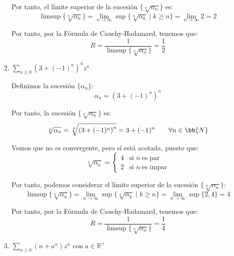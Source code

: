 \begin{ejercicio}
\begin{enumerate}
        Por tanto, el límite superior de la sucesión $\{\sqrt[n]{\alpha_n}\}$ es:
        \begin{equation*}
            \limsup\{\sqrt[n]{\alpha_n}\} = \lim_{n \to \infty} \sup\{\sqrt[k]{\alpha_k} \mid k \geq n\} = \lim_{n \to \infty} 2 = 2
        \end{equation*}

        Por tanto, por la Fórmula de Cauchy-Hadamard, tenemos que:
        \begin{equation*}
            R = \dfrac{1}{\limsup\{\sqrt[n]{\alpha_n}\}} = \dfrac{1}{2}
        \end{equation*}
        
        \item $\displaystyle \sum_{n \geq 0} \left(3+(-1)^n\right)^n z^n$
        
        Definimos la sucesión $\{\alpha_n\}$:
        \[
            \alpha_n = \left(3+(-1)^n\right)^n
        \]

        Por tanto, la sucesión $\{\sqrt[n]{\alpha_n}\}$ es:
        \[
            \sqrt[n]{\alpha_n} = \sqrt[n]{\left(3+(-1)^n\right)^n} = 3+(-1)^n\qquad \forall n\in \bb{N}
        \]

        Vemos que no es convergente, pero sí está acotada, puesto que:
        \begin{equation*}
            \sqrt[n]{\alpha_n} = \begin{cases}
                4 & \text{si } n\ \text{es par}\\
                2 & \text{si } n\ \text{es impar}
            \end{cases}
        \end{equation*}

        Por tanto, podemos considerar el límite superior de la sucesión $\{\sqrt[n]{\alpha_n}\}$:
        \begin{equation*}
            \limsup\{\sqrt[n]{\alpha_n}\} = \lim_{n \to \infty} \sup\{\sqrt[k]{\alpha_k} \mid k \geq n\} = \lim_{n \to \infty} \sup\{2,4\} = 4
        \end{equation*}

        Por tanto, por la Fórmula de Cauchy-Hadamard, tenemos que:
        \begin{equation*}
            R = \dfrac{1}{\limsup\{\sqrt[n]{\alpha_n}\}} = \dfrac{1}{4}
        \end{equation*}

        \item $\displaystyle \sum_{n \geq 0} \left(n+a^n\right)z^n$ con $a \in \mathbb{R}^+$
        

\end{enumerate}
\end{ejercicio}
